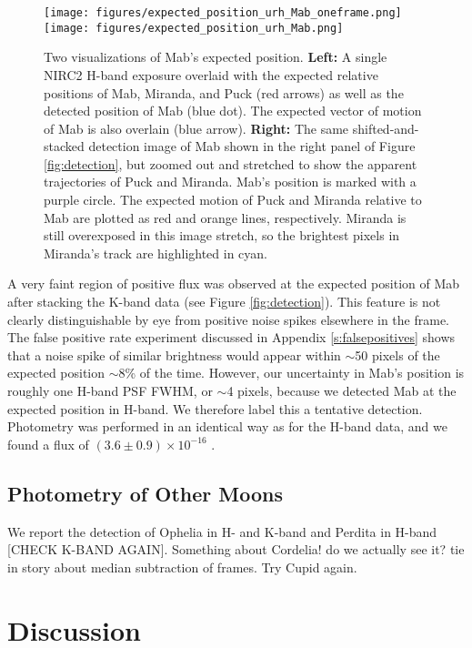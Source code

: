 \documentclass[preprint]{aastex631}
\begin{document}
\begin{figure}
\texttt{[image: figures/expected\_position\_urh\_Mab\_oneframe.png]}
\texttt{[image: figures/expected\_position\_urh\_Mab.png]}
\caption{Two visualizations of Mab's expected position. \textbf{Left:} A single NIRC2 H-band exposure overlaid with the expected relative positions of Mab, Miranda, and Puck (red arrows) as well as the detected position of Mab (blue dot). The expected vector of motion of Mab is also overlain (blue arrow). \textbf{Right:} The same shifted-and-stacked detection image of Mab shown in the right panel of Figure \ref{fig:detection}, but zoomed out and stretched to show the apparent trajectories of Puck and Miranda. Mab's position is marked with a purple circle. The expected motion of Puck and Miranda relative to Mab are plotted as red and orange lines, respectively. Miranda is still overexposed in this image stretch, so the brightest pixels in Miranda's track are highlighted in cyan.\label{fig:astrometry}}
\end{figure}

A very faint region of positive flux was observed at the expected position of Mab after stacking the K-band data (see Figure \ref{fig:detection}). This feature is not clearly distinguishable by eye from positive noise spikes elsewhere in the frame. The false positive rate experiment discussed in Appendix \ref{s:falsepositives} shows that a noise spike of similar brightness would appear within $\sim$50 pixels of the expected position $\sim$8\% of the time. However, our uncertainty in Mab's position is roughly one H-band PSF FWHM, or $\sim$4 pixels, because we detected Mab at the expected position in H-band. We therefore label this a tentative detection. Photometry was performed in an identical way as for the H-band data, and we found a flux of $(3.6 \pm 0.9)\times10^{-16}$ \ergsec.



\subsection{Photometry of Other Moons}

We report the detection of Ophelia in H- and K-band and Perdita in H-band [CHECK K-BAND AGAIN].
Something about Cordelia! do we actually see it?
tie in story about median subtraction of frames.
Try Cupid again.

\section{Discussion}
\label{s:discussion}
\end{document}
